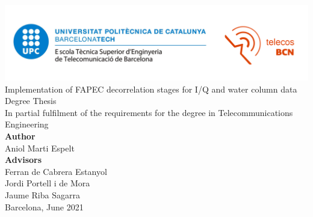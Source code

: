 \thispagestyle{empty}

\begin{center}
	\includegraphics[width=\textwidth]{images/logo.png}\\
	
	\vspace*{2.5cm}
	\Huge
	Implementation of FAPEC decorrelation stages for I/Q and water column data\\
	
	\vspace*{2.6cm}
	\large
	Degree Thesis\\
	In partial fulfilment of the requirements for the degree in Telecommunications Engineering\\
	
	\vspace*{2cm}
	\textbf{Author}\\
	Aniol Marti Espelt\\
	\vspace*{1.5em}
	\textbf{Advisors}\\
	Ferran de Cabrera Estanyol\\
	Jordi Portell i de Mora\\
	Jaume Riba Sagarra\\
	
	\vspace*{2.5cm}
	Barcelona, June 2021
	
\end{center}
